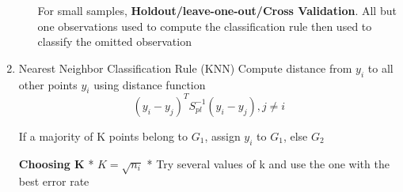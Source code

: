 \documentclass[11pt]{article}
\begin{document}
\begin{enumerate}
\begin{enumerate}
For small samples, \textbf{Holdout/leave-one-out/Cross Validation}. All but one
observations used to compute the classification rule then used to
classify the omitted observation
\end{enumerate}

\item Nearest Neighbor Classification Rule (KNN)
\label{sec:org58e7584}
Compute distance from \(y_i\) to all other points \(y_i\) using distance
function
$$
 (y_i - y_j)^TS_{pl}^{-1}(y_i - y_j), j \ne i
$$

If a majority of K points belong to \(G_1\), assign \(y_i\) to \(G_1\), else
\(G_2\)

\textbf{Choosing K} * \(K = \sqrt{n_i}\) * Try several values of k and use the
one with the best error rate
\end{enumerate}
\end{document}
